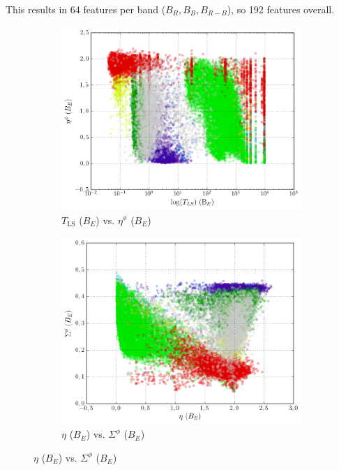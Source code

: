 This results in 64 features per band ($B_R, B_B, B_{R-B}$), so 192 features overall.

\begin{figure}[h]
	\centering
	\begin{subfigure}[t]{0.49\textwidth}
		\centering
		\caption{$T_{\text{LS}}$ ($B_E$) vs. $\eta^\phi$ ($B_E$)}
		\label{fig:2a}
		\includegraphics[width=\textwidth]{figures/scatterplots/B-ls-period-B-phase-eta.png}				
	\end{subfigure}
	\begin{subfigure}[t]{0.49\textwidth}
		\centering
		\caption{$\eta$ ($B_E$) vs. $\Sigma^\phi$ ($B_E$)}
		\label{fig:2b}
		\includegraphics[width=\textwidth]{figures/scatterplots/B-eta-B-phase-cs.png}		

\end{subfigure}
\end{figure}

